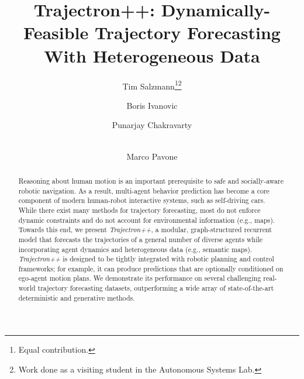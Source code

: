 \documentclass[runningheads]{llncs}
\newcommand{\algname}{\mbox{Trajectron++}}
\newcommand{\emphalgname}{\emph{\algname}}
\begin{document}
\pagestyle{headings}
\mainmatter
\def\ECCVSubNumber{3094}  

\title{
\algname{}: Dynamically-Feasible Trajectory Forecasting With Heterogeneous Data
}

\begin{comment}
\titlerunning{ECCV-20 submission ID \ECCVSubNumber} 
\authorrunning{ECCV-20 submission ID \ECCVSubNumber} 
\author{Anonymous ECCV submission}
\institute{Paper ID \ECCVSubNumber}
\end{comment}


\author{Tim Salzmann\thanks{Equal contribution.}\thanks{Work done as a visiting student in the Autonomous Systems Lab.} \and
Boris Ivanovic \and Punarjay Chakravarty \and \\Marco Pavone} 
\maketitle
\setcounter{footnote}{0}
\begin{abstract}
   Reasoning about human motion is an important prerequisite to safe and socially-aware robotic navigation. 
   As a result, multi-agent behavior prediction has become a core component of modern human-robot interactive systems, such as self-driving cars. 
   While there exist many methods for trajectory forecasting, most do not enforce dynamic constraints and do not account for environmental information (e.g., maps). 
   Towards this end, we present \emphalgname{}, a modular, graph-structured recurrent model that forecasts the trajectories of a general number of diverse agents while incorporating agent dynamics and heterogeneous data (e.g., semantic maps).
   \emphalgname{} is designed to be tightly integrated with robotic planning and control frameworks; for example, it can produce predictions that are optionally conditioned on ego-agent motion plans. 
   We demonstrate its performance on several challenging real-world trajectory forecasting datasets, outperforming a wide array of state-of-the-art deterministic and generative methods.

\end{abstract}
\end{document}
